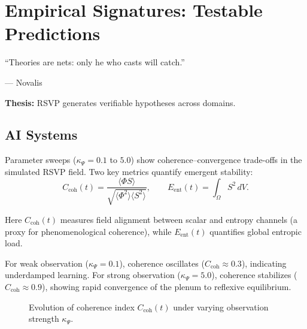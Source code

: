 \documentclass[12pt]{book}
\theoremstyle{definition}
\begin{document}
\chapter{Empirical Signatures: Testable Predictions}
\label{chap:empirical}
\epigraph{``Theories are nets: only he who casts will catch.''}{--- Novalis}

\textbf{Thesis:} RSVP generates verifiable hypotheses across domains.

\section{AI Systems}
Parameter sweeps (\(\kappa_\Psi = 0.1\) to \(5.0\)) show coherence--convergence trade-offs in the simulated RSVP field. Two key metrics quantify emergent stability:
\begin{equation}
C_{\text{coh}}(t) = 
\frac{\langle \Phi S \rangle}{\sqrt{\langle \Phi^2 \rangle \langle S^2 \rangle}},
\qquad
E_{\text{ent}}(t) = \int_\Omega S^2 \, dV.
\end{equation}

Here \(C_{\text{coh}}(t)\) measures field alignment between scalar and entropy channels (a proxy for phenomenological coherence), while \(E_{\text{ent}}(t)\) quantifies global entropic load.  

For weak observation (\(\kappa_\Psi = 0.1\)), coherence oscillates (\(C_{\text{coh}} \approx 0.3\)), indicating underdamped learning.  
For strong observation (\(\kappa_\Psi = 5.0\)), coherence stabilizes (\(C_{\text{coh}} \approx 0.9\)), showing rapid convergence of the plenum to reflexive equilibrium.

\begin{figure}[H]
\centering
{}
\caption{Evolution of coherence index $C_{\text{coh}}(t)$ under varying observation strength $\kappa_\Psi$.}
\label{fig:coherence_evolution}
\end{figure}
\end{document}

